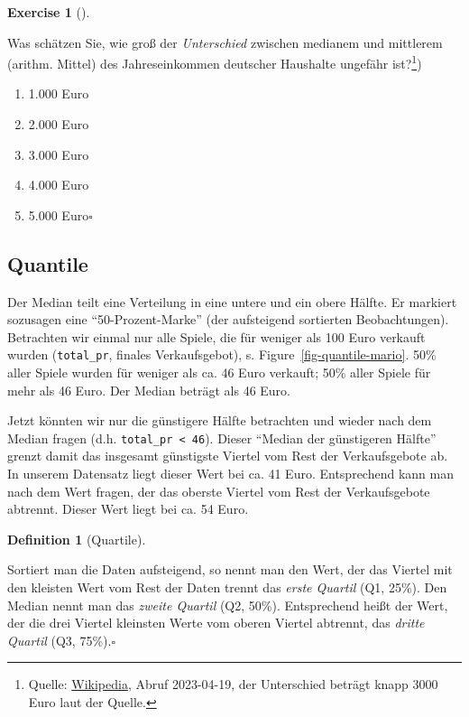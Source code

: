 \documentclass[
  letterpaper,
  DIV=11,
  numbers=noendperiod]{scrartcl}
\providecommand{\tightlist}{%
  \setlength{\itemsep}{0pt}\setlength{\parskip}{0pt}}\usepackage{longtable,booktabs,array}
\theoremstyle{definition}
\theoremstyle{definition}
\newtheorem{exercise}{Exercise}[section]
\theoremstyle{definition}
\newtheorem{definition}{Definition}[section]
\theoremstyle{remark}
\begin{document}
\begin{exercise}[]\protect\hypertarget{exr-mw-wealthmd}{}\label{exr-mw-wealthmd}

Was schätzen Sie, wie groß der \emph{Unterschied} zwischen medianem und
mittlerem (arithm. Mittel) des Jahreseinkommen deutscher Haushalte
ungefähr ist?\footnote{Quelle:
  \href{https://de.wikipedia.org/wiki/Einkommensverteilung_in_Deutschland}{Wikipedia},
  Abruf 2023-04-19, der Unterschied beträgt knapp 3000 Euro laut der
  Quelle.})

\begin{enumerate}
\def\labelenumi{\alph{enumi})}
\tightlist
\item
  1.000 Euro
\item
  2.000 Euro
\item
  3.000 Euro
\item
  4.000 Euro
\item
  5.000 Euro\(\square\)
\end{enumerate}

\end{exercise}

\subsection{Quantile}\label{quantile}

Der Median teilt eine Verteilung in eine untere und ein obere Hälfte. Er
markiert sozusagen eine ``50-Prozent-Marke'' (der aufsteigend sortierten
Beobachtungen). Betrachten wir einmal nur alle Spiele, die für weniger
als 100 Euro verkauft wurden (\texttt{total\_pr}, finales
Verkaufsgebot), s. Figure~\ref{fig-quantile-mario}. 50\% aller Spiele
wurden für weniger als ca. 46 Euro verkauft; 50\% aller Spiele für mehr
als 46 Euro. Der Median beträgt als 46 Euro.

Jetzt könnten wir nur die günstigere Hälfte betrachten und wieder nach
dem Median fragen (d.h. \texttt{total\_pr\ \textless{}\ 46}). Dieser
``Median der günstigeren Hälfte'' grenzt damit das insgesamt günstigste
Viertel vom Rest der Verkaufsgebote ab. In unserem Datensatz liegt
dieser Wert bei ca. 41 Euro. Entsprechend kann man nach dem Wert fragen,
der das oberste Viertel vom Rest der Verkaufsgebote abtrennt. Dieser
Wert liegt bei ca. 54 Euro.

\begin{definition}[Quartile]\protect\hypertarget{def-quartile}{}\label{def-quartile}

Sortiert man die Daten aufsteigend, so nennt man den Wert, der das
Viertel mit den kleisten Wert vom Rest der Daten trennt das \emph{erste
Quartil} (Q1, 25\%). Den Median nennt man das \emph{zweite Quartil} (Q2,
50\%). Entsprechend heißt der Wert, der die drei Viertel kleinsten Werte
vom oberen Viertel abtrennt, das \emph{dritte Quartil} (Q3,
75\%).\(\square\)

\end{definition}
\end{document}
